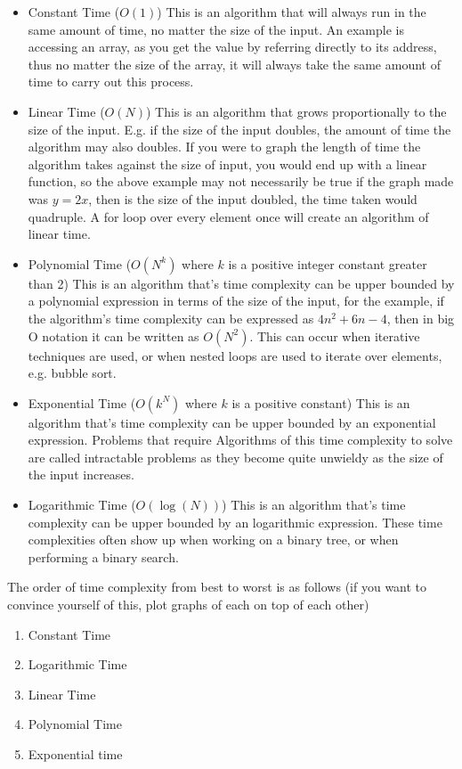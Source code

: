   \begin{itemize}
  	\item Constant Time ($O(1)$)
	  	\subitem This is an algorithm that will always run in the same amount of time, no matter the size of the input. An example is accessing an array, as you get the value by referring directly to its address, thus no matter the size of the array, it will always take the same amount of time to carry out this process.
  	\item Linear Time ($O(N)$)
	  	\subitem This is an algorithm that grows proportionally to the size of the input. E.g. if the size of the input doubles, the amount of time the algorithm may also doubles. If you were to graph the length of time the algorithm takes against the size of input, you would end up with a linear function, so the above example may not necessarily be true if the graph made was $y=2x$, then is the size of the input doubled, the time taken would quadruple. A for loop over every element once will create an algorithm of linear time.
  	\item Polynomial Time ($O(N^k)$ where $k$ is a positive integer constant greater than 2)
	  	\subitem This is an algorithm that's time complexity can be upper bounded by a polynomial expression in terms of the size of the input, for the example, if the algorithm's time complexity can be expressed as $4n^2 + 6n - 4$, then in big O notation it can be written as $O(N^2)$. This can occur when iterative techniques are used, or when nested loops are used to iterate over elements, e.g. bubble sort.
  	\item Exponential Time ($O(k^N)$ where $k$ is a positive constant)
	  	\subitem This is an algorithm that's time complexity can be upper bounded by an exponential expression. Problems that require Algorithms of this time complexity to solve are called intractable problems as they become quite unwieldy as the size of the input increases.  	
  	\item Logarithmic Time ($O(\log(N))$)
	  	\subitem This is an algorithm that's time complexity can be upper bounded by an logarithmic expression. These time complexities often show up when working on a binary tree, or when performing a binary search.
  \end{itemize}
  
  The order of time complexity from best to worst is as follows (if you want to convince yourself of this, plot graphs of each on top of each other)
  \begin{enumerate}
  	\item Constant Time
  	\item Logarithmic Time
  	\item Linear Time
  	\item Polynomial Time
  	\item Exponential time
  \end{enumerate}
  
